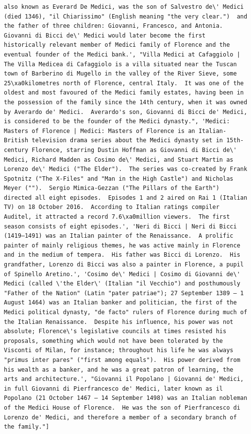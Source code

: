 \begin{instructbox}
\begin{lstlisting}[breakindent=0pt, breaklines=true, breakatwhitespace=true, frame=single, backgroundcolor=\color{green!10}]
    also known as Everard De Medici, was the son of Salvestro de\' Medici (died 1346), "il Chiarissimo" (English meaning "the very clear.")  and the father of three children: Giovanni, Francesco, and Antonia.  Giovanni di Bicci de\' Medici would later become the first historically relevant member of Medici family of Florence and the eventual founder of the Medici bank.', "Villa Medici at Cafaggiolo | The Villa Medicea di Cafaggiolo is a villa situated near the Tuscan town of Barberino di Mugello in the valley of the River Sieve, some 25\xa0kilometres north of Florence, central Italy.  It was one of the oldest and most favoured of the Medici family estates, having been in the possession of the family since the 14th century, when it was owned by Averardo de' Medici.  Averardo's son, Giovanni di Bicci de' Medici, is considered to be the founder of the Medici dynasty.", 'Medici: Masters of Florence | Medici: Masters of Florence is an Italian-British television drama series about the Medici dynasty set in 15th-century Florence, starring Dustin Hoffman as Giovanni di Bicci de\' Medici, Richard Madden as Cosimo de\' Medici, and Stuart Martin as Lorenzo de\' Medici ("The Elder").  The series was co-created by Frank Spotnitz ("The X-Files" and "Man in the High Castle") and Nicholas Meyer ("").  Sergio Mimica-Gezzan ("The Pillars of the Earth") directed all eight episodes.  Episodes 1 and 2 aired on Rai 1 (Italian TV) on 18 October 2016.  According to Italian ratings compiler Auditel, it attracted a record 7.6\xa0million viewers.  The first season consists of eight episodes.', 'Neri di Bicci | Neri di Bicci (1419–1491) was an Italian painter of the Renaissance.  A prolific painter of mainly religious themes, he was active mainly in Florence and in the medium of tempera.  His father was Bicci di Lorenzo.  His grandfather, Lorenzo di Bicci was also a painter in Florence, a pupil of Spinello Aretino.', 'Cosimo de\' Medici | Cosimo di Giovanni de\' Medici (called \'the Elder\' (Italian "il Vecchio") and posthumously "Father of the Nation" (Latin "pater patriae"); 27 September 1389 – 1 August 1464) was an Italian banker and politician, the first of the Medici political dynasty, "de facto" rulers of Florence during much of the Italian Renaissance.  Despite his influence, his power was not absolute; Florence\'s legislative councils at times resisted his proposals, something which would not have been tolerated by the Visconti of Milan, for instance; throughout his life he was always "primus inter pares" ("first among equals").  His power derived from his wealth as a banker, and he was a great patron of learning, the arts and architecture.', "Giovanni il Popolano | Giovanni de' Medici, in full Giovanni di Pierfrancesco de' Medici, later known as il Popolano (21 October 1467 – 14 September 1498) was an Italian nobleman of the Medici House of Florence.  He was the son of Pierfrancesco di Lorenzo de' Medici, and therefore a member of a secondary branch of the family."]

\end{lstlisting}
\end{instructbox}
